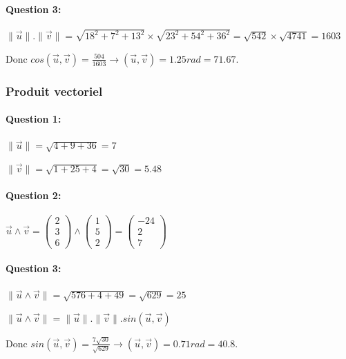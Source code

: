 \paragraph{Question 3:} $\|\overrightarrow{u}\|.\|\overrightarrow{v}\|=\sqrt{18^2+7^2+13^2}\times \sqrt{23^2+54^2+36^2}=\sqrt{542}\times \sqrt{4741}=1603$

Donc $cos(\overrightarrow{u},\overrightarrow{v})=\frac{504}{1603}\rightarrow (\overrightarrow{u},\overrightarrow{v})=1.25rad=71.67$\textdegree.

\subsubsection{Produit vectoriel}

\paragraph{Question 1:} $\|\overrightarrow{u}\|=\sqrt{4+9+36}=7$

$\|\overrightarrow{v}\|=\sqrt{1+25+4}=\sqrt{30}=5.48$

\paragraph{Question 2:} $\overrightarrow{u}\wedge \overrightarrow{v}=\left(\begin{array}{c} 2 \\ 3 \\ 6 \end{array}\right)\wedge 
\left(\begin{array}{c} 1 \\ 5 \\ 2 \end{array}\right)=\left(\begin{array}{c} -24 \\ 2 \\ 7 \end{array}\right)$

\paragraph{Question 3:} $\|\overrightarrow{u}\wedge \overrightarrow{v}\|=\sqrt{576+4+49}=\sqrt{629}=25$

$\|\overrightarrow{u}\wedge \overrightarrow{v}\|=\|\overrightarrow{u}\|.\|\overrightarrow{v}\|.sin(\overrightarrow{u},\overrightarrow{v})$

Donc $sin(\overrightarrow{u},\overrightarrow{v})=\frac{7\sqrt{30}}{\sqrt{629}}\rightarrow (\overrightarrow{u},\overrightarrow{v})=0.71rad=40.8$\textdegree.

